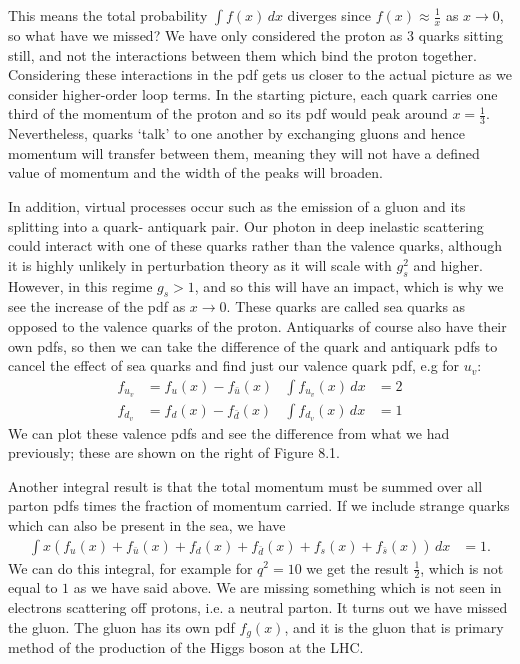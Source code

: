 \documentclass[a4paper, 11pt, normalem]{report}
\begin{document}
This means the total probability $\int f(x)\,dx$ diverges since $f(x)\approx\frac1x$ as $x\to0$, so what have we missed?
We have only considered the proton as 3 quarks sitting still, and not the interactions between them which bind the proton together.
Considering these interactions in the pdf gets us closer to the actual picture as we consider higher-order loop terms.
In the starting picture, each quark carries one third of the momentum of the proton and so its pdf would peak around $x=\frac13$.
Nevertheless, quarks `talk' to one another by exchanging gluons and hence momentum will transfer between them, meaning they will not have a defined value of momentum and the width of the peaks will broaden.

In addition, virtual processes occur such as the emission of a gluon and its splitting into a quark- antiquark pair.
Our photon in deep inelastic scattering could interact with one of these quarks rather than the valence quarks, although it is highly unlikely in perturbation theory as it will scale with $g_s^2$ and higher.
However, in this regime $g_s>1$, and so this will have an impact, which is why we see the increase of the pdf as $x\to0$.
These quarks are called sea quarks as opposed to the valence quarks of the proton.
Antiquarks of course also have their own pdfs, so then we can take the difference of the quark and antiquark pdfs to cancel the effect of sea quarks and find just our valence quark pdf, e.g for $u_v$:
\begin{align}
    f_{u_v} &= f_u(x) - f_{\bar{u}}(x) & \int f_{u_v}(x)\,dx &= 2\\
    f_{d_v} &= f_d(x) - f_{\bar{d}}(x) & \int f_{d_v}(x)\,dx &= 1
\end{align}
We can plot these valence pdfs and see the difference from what we had previously; these are shown on the right of Figure 8.1.

Another integral result is that the total momentum must be summed over all parton pdfs times the fraction of momentum carried.
If we include strange quarks which can also be present in the sea, we have
\begin{align}
    \int x\left(f_u(x)+f_{\bar{u}}(x)+f_d(x)+f_{\bar{d}}(x)+f_s(x)+f_{\bar{s}}(x)\right)\,dx &= 1.
\end{align}
We can do this integral, for example for $q^2=10$ we get the result $\frac12$, which is not equal to $1$ as we have said above.
We are missing something which is not seen in electrons scattering off protons, i.e. a neutral parton.
It turns out we have missed the gluon.
The gluon has its own pdf $f_g(x)$, and it is the gluon that is primary method of the production of the Higgs boson at the LHC.
\end{document}
